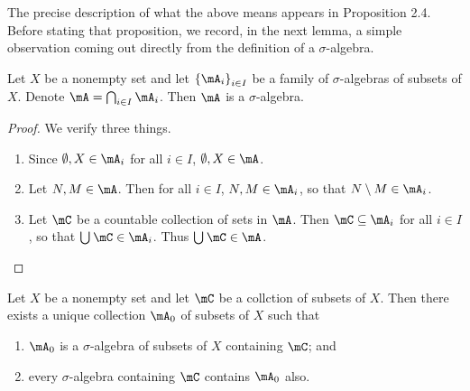 \documentclass[pmath450]{subfiles}
\begin{document}
    The precise description of what the above means appears in Proposition 2.4. Before stating that proposition, we record, in the next lemma, a simple observation coming out directly from the definition of a $\sigma$-algebra. 

    \begin{lemma}{}
        Let $X$ be a nonempty set and let $\left\lbrace \mA_i \right\rbrace^{}_{i\in I}$ be a family of $\sigma$-algebras of subsets of $X$. Denote $\mA=\bigcap^{}_{i\in I}\mA_i$. Then $\mA$ is a $\sigma$-algebra.
    \end{lemma}

    \begin{proof}
        We verify three things.
        \begin{enumerate}
            \item Since $\emptyset,X\in\mA_i$ for all $i\in I$, $\emptyset,X\in\mA$.
            \item Let $N,M\in\mA$. Then for all $i\in I$, $N,M\in\mA_i$, so that $N\setminus M\in\mA_i$.
            \item Let $\mC$ be a countable collection of sets in $\mA$. Then $\mC\subseteq\mA_i$ for all $i\in I$, so that $\bigcup^{}_{}\mC\in\mA_i$. Thus $\bigcup^{}_{}\mC\in\mA$.
        \end{enumerate}
    \end{proof}

    \begin{prop}{}
        Let $X$ be a nonempty set and let $\mC$ be a collction of subsets of $X$. Then there exists a unique collection $\mA_0$ of subsets of $X$ such that
        \begin{enumerate}
            \item $\mA_0$ is a $\sigma$-algebra of subsets of $X$ containing $\mC$; and
            \item every $\sigma$-algebra containing $\mC$ contains $\mA_0$ also.
        \end{enumerate}
    \end{prop}
\end{document}
